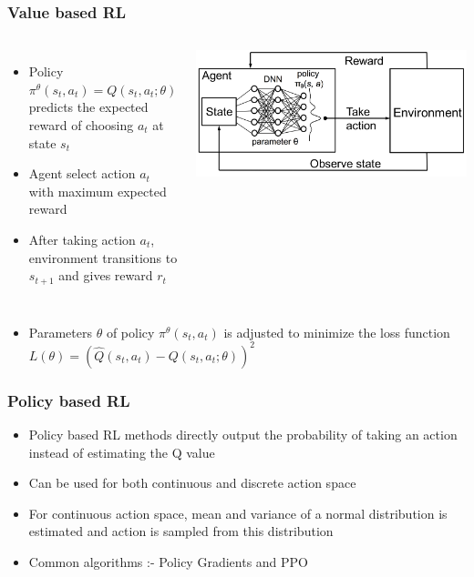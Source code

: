\documentclass{beamer}
\begin{document}
\begin{frame}
\frametitle{Value based RL}
\begin{columns}[c]
	
	\begin{itemize}
		\item Policy $\pi^{\theta}(s_t, a_t) = Q(s_t, a_t; \theta)$ predicts the expected reward of choosing $a_t$ at state $s_t$
		\item Agent select action $a_t$ with maximum expected reward
		\item After taking action $a_t$, environment transitions to $s_{t+1}$ and gives reward $r_t$
	\end{itemize}
	
	\begin{center}
		\includegraphics[scale=0.06]{dqn.png}
	\end{center}
	
\end{columns}

\begin{itemize}
	\item Parameters $\theta$ of policy $\pi^{\theta}(s_t, a_t)$ is adjusted to minimize the loss function $L(\theta) = (\hat{Q}(s_t, a_t) - Q(s_t, a_t; \theta))^2$
\end{itemize}

\end{frame}


\begin{frame}
\frametitle{Policy based RL}
\begin{itemize}
	\item Policy based RL methods directly output the probability of taking an action instead of estimating the Q value
	\item Can be used for both continuous and discrete action space
	\item For continuous action space, mean and variance of a normal distribution is estimated and action is sampled from this distribution
	\item Common algorithms :- Policy Gradients and PPO
\end{itemize}
\end{frame}
\end{document}

